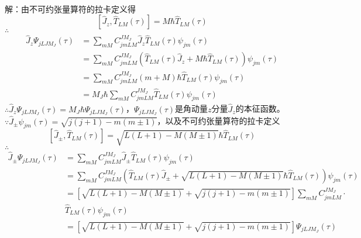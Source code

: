 \documentclass[12pt]{article}
\numberwithin{equation}{section}	 %
\begin{document}
\begin{spacing}{1.5}
~\\
解：由不可约张量算符的拉卡定义得\\
\begin{equation}\nonumber 		%
\left[ \hat{J}_{z},\hat{T}_{LM}(\tau) \right] = M\hbar\hat{T}_{LM}(\tau)
\end{equation}
$\therefore$
\begin{align*}
\hat{J}_{z}\Psi_{jLJM_{J}}(\tau) &= \sum_{mM} C_{jmLM}^{JM_{J}}\hat{J}_{z}\hat{T}_{LM}(\tau)\psi_{jm}(\tau) \\
&= \sum_{mM} C_{jmLM}^{JM_{J}} \left( \hat{T}_{LM}(\tau)\hat{J}_{z}+M\hbar\hat{T}_{LM}(\tau) \right)\psi_{jm}(\tau) \\
&= \sum_{mM} C_{jmLM}^{JM_{J}}(m+M)\hbar\hat{T}_{LM}(\tau)\psi_{jm}(\tau) \\
&= M_{J}\hbar\sum_{mM} C_{jmLM}^{JM_{J}}\hat{T}_{LM}(\tau)\psi_{jm}(\tau)
\end{align*}
$\therefore \hat{J}_{z}\Psi_{jLJM_{J}}(\tau) = M_{J}\hbar\Psi_{jLJM_{J}}(\tau)$，$\displaystyle \Psi_{jLJM_{J}}(\tau)$是角动量$z$分量$\hat{J}_{z}$的本征函数。\\
$\because \displaystyle \hat{J}_{\pm}\psi_{jm}(\tau)=\sqrt{j(j+1)-m(m\pm1)}$，以及不可约张量算符的拉卡定义
\begin{equation}\nonumber 		%
\left[ \hat{J}_{\pm},\hat{T}_{LM}(\tau) \right] = \sqrt{L(L+1)-M(M\pm1)}\hbar\hat{T}_{LM}(\tau)
\end{equation}
$\therefore$
\begin{align*}
\hat{J}_{\pm}\Psi_{jLJM_{J}}(\tau) &= \sum_{mM} C_{jmLM}^{JM_{J}}\hat{J}_{\pm}\hat{T}_{LM}(\tau)\psi_{jm}(\tau) \\
&= \sum_{mM} C_{jmLM}^{JM_{J}} \left( \hat{T}_{LM}(\tau)\hat{J}_{\pm}+\sqrt{L(L+1)-M(M\pm1)}\hbar\hat{T}_{LM}(\tau) \right)\psi_{jm}(\tau) \\
&= \left[\sqrt{L(L+1)-M(M\pm1)} + \sqrt{j(j+1)-m(m\pm1)}\right] \sum_{mM} C_{jmLM}^{JM_{J}}\cdot \\ &\hat{T}_{LM}(\tau)\psi_{jm}(\tau) \\
&= \left[\sqrt{L(L+1)-M(M\pm1)} + \sqrt{j(j+1)-m(m\pm1)}\right] \Psi_{jLJM_{J}}(\tau)
\end{align*}
~\\
~\\



\end{spacing}
\end{document}
